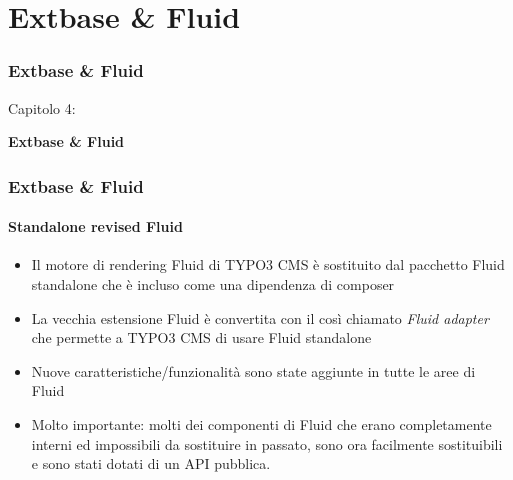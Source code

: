 %

\section{Extbase \& Fluid}
\begin{frame}[fragile]
	\frametitle{Extbase \& Fluid}

	\begin{center}\huge{Capitolo 4:}\end{center}
	\begin{center}\huge{\color{typo3darkgrey}\textbf{Extbase \& Fluid}}\end{center}

\end{frame}


\begin{frame}[fragile]
	\frametitle{Extbase \& Fluid}
	\framesubtitle{Standalone revised Fluid}

	\lstset{basicstyle=\tiny\ttfamily}

	\begin{itemize}

		\item Il motore di rendering Fluid di TYPO3 CMS è sostituito dal pacchetto
			Fluid standalone che è incluso come una dipendenza di composer

		\item La vecchia estensione Fluid è convertita con il così chiamato \textit{Fluid adapter}
			che permette a TYPO3 CMS di usare Fluid standalone

		\item Nuove caratteristiche/funzionalità sono state aggiunte in tutte le aree di Fluid

		\item Molto importante: molti dei componenti di Fluid che erano completamente interni
			ed impossibili da sostituire in passato, sono ora facilmente sostituibili
			e sono stati dotati di un API pubblica.

	\end{itemize}

\end{frame}

